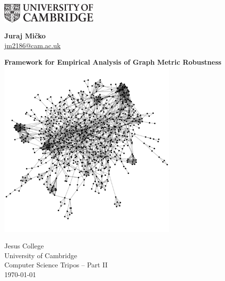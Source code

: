 \documentclass[12pt,a4paper,twoside,openany]{report}
\begin{document}


    \pagestyle{empty}

    \begin{minipage}{.45\linewidth}
        \begin{flushleft}
            \includegraphics[height=10mm]{uc-black-white.eps}
        \end{flushleft}
    \end{minipage}
    \hfill
    \begin{minipage}{.45\linewidth}
        \begin{flushright}
            \Large \textbf{Juraj Mi\v{c}ko} \\
            \normalsize \href{mailto:jm2186@cam.ac.uk}{jm2186@cam.ac.uk}
        \end{flushright}
    \end{minipage}

    \vspace*{45mm}
    \begin{center}
        \LARGE
        \textbf{Framework for Empirical Analysis of Graph Metric Robustness} \\[5mm]

        \vspace{5mm}
        \includegraphics[height=9cm]{cover_graph_img.png}
        \vspace{5mm}

        \Large
        Jesus College \\
        University of Cambridge \\[5mm]
        Computer Science Tripos -- Part II \\[5mm]
        \today  %
    \end{center}
\end{document}
